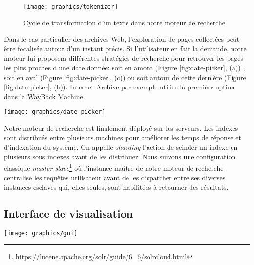 \documentclass[symmetric,justified,marginals=raggedouter]{tufte-book}
\begin{document}
\begin{figure}%
  \texttt{[image: graphics/tokenizer]}
  \caption{Cycle de transformation d'un texte dans notre moteur de recherche}
  \label{fig:tokenizer}
\end{figure}

\noindent Dans le cas particulier des archives Web, l'exploration de pages collectées peut être focalisée autour d'un instant précis. Si l'utilisateur en fait la demande, notre moteur lui proposera différentes stratégies de recherche pour retrouver les pages les plus proches d'une date donnée: soit en amont (Figure \ref{fig:date-picker}, (a)) , soit en aval (Figure \ref{fig:date-picker}, (c)) ou soit autour de cette dernière (Figure \ref{fig:date-picker}, (b)). Internet Archive par exemple utilise la première option dans la WayBack Machine.

\begin{figure*}%
  \texttt{[image: graphics/date-picker]}
  \caption{Stratégies de choix d'un ensemble de pages par rapport à une date précise}
  \label{fig:date-picker}
\end{figure*}

\noindent Notre moteur de recherche est finalement déployé sur les serveurs. Les indexes sont distribués entre plusieurs machines pour améliorer les temps de réponse et d'indexation du système. On appelle \textit{sharding} l'action de scinder un indexe en plusieurs sous indexes avant de les distribuer. Nous suivons une configuration classique \textit{master-slave}\footnote{\url{https://lucene.apache.org/solr/guide/6_6/solrcloud.html}} où l'instance maître de notre moteur de recherche centralise les requêtes utilisateur avant de les dispatcher entre ses diverses instances esclaves qui, elles seules, sont habilitées à retourner des résultats. 

\subsection{Interface de visualisation}

\begin{figure*}%
  \texttt{[image: graphics/gui]}
  \caption{Capture d'écran de notre interface de visualisation}
  \label{fig:gui}
\end{figure*}
\end{document}
